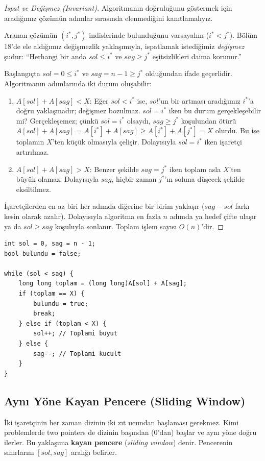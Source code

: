 \begin{proof}[İspat ve Değişmez (Invariant)]
Algoritmanın doğruluğunu göstermek için aradığımız çözümün adımlar sırasında elenmediğini kanıtlamalıyız.

Aranan çözümün $(i^*, j^*)$ indislerinde bulunduğunu varsayalım ($i^* < j^*$). Bölüm 18'de ele aldığımız değişmezlik yaklaşımıyla, ispatlamak istediğimiz \emph{değişmez} şudur: ``Herhangi bir anda $sol \le i^*$ ve $sag \ge j^*$ eşitsizlikleri daima korunur.''

Başlangıçta $sol = 0 \le i^*$ ve $sag = n-1 \ge j^*$ olduğundan ifade geçerlidir. Algoritmanın adımlarında iki durum oluşabilir:
\begin{enumerate}
    \item $A[sol] + A[sag] < X$: Eğer $sol < i^*$ ise, $sol$'un bir artması aradığımız $i^*$'a doğru yaklaşmadır; değişmez bozulmaz. $sol = i^*$ iken bu durum gerçekleşebilir mi? Gerçekleşemez; çünkü $sol = i^*$ olsaydı, $sag \ge j^*$ koşulundan ötürü $A[sol] + A[sag] = A[i^*] + A[sag] \ge A[i^*] + A[j^*] = X$ olurdu. Bu ise toplamın $X$'ten küçük olmasıyla çelişir. Dolayısıyla $sol = i^*$ iken işaretçi artırılmaz.
    \item $A[sol] + A[sag] > X$: Benzer şekilde $sag = j^*$ iken toplam asla $X$'ten büyük olamaz. Dolayısıyla $sag$, hiçbir zaman $j^*$'ın soluna düşecek şekilde eksiltilmez.
\end{enumerate}
İşaretçilerden en az biri her adımda diğerine bir birim yaklaşır ($sag - sol$ farkı kesin olarak azalır). Dolayısıyla algoritma en fazla $n$ adımda ya hedef çifte ulaşır ya da $sol \ge sag$ koşuluyla sonlanır. Toplam işlem sayısı $O(n)$'dir.
\end{proof}

\begin{lstlisting}[language=CTemel]
int sol = 0, sag = n - 1;
bool bulundu = false;

while (sol < sag) {
    long long toplam = (long long)A[sol] + A[sag];
    if (toplam == X) {
        bulundu = true;
        break;
    } else if (toplam < X) {
        sol++; // Toplami buyut
    } else {
        sag--; // Toplami kucult
    }
}
\end{lstlisting}

\subsection{Aynı Yöne Kayan Pencere (Sliding Window)}
İki işaretçinin her zaman dizinin iki zıt ucundan başlaması gerekmez. Kimi problemlerde two pointers de dizinin başından ($0$'dan) başlar ve aynı yöne doğru ilerler. Bu yaklaşıma \textbf{kayan pencere} (\emph{sliding window}) denir. Pencerenin sınırlarını $[sol, sag]$ aralığı belirler.

